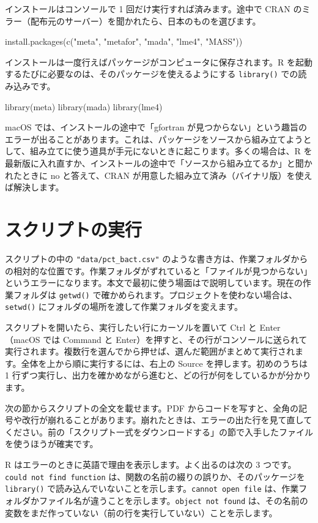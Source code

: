 インストールはコンソールで 1 回だけ実行すれば済みます。途中で CRAN のミラー（配布元のサーバー）を聞かれたら、日本のものを選びます。
\begin{rcode}
install.packages(c("meta", "metafor", "mada", "lme4", "MASS"))
\end{rcode}

インストールは一度行えばパッケージがコンピュータに保存されます。R を起動するたびに必要なのは、そのパッケージを使えるようにする \texttt{library()} での読み込みです。
\begin{rcode}
library(meta)
library(mada)
library(lme4)
\end{rcode}

macOS では、インストールの途中で「gfortran が見つからない」という趣旨のエラーが出ることがあります。これは、パッケージをソースから組み立てようとして、組み立てに使う道具が手元にないときに起こります。多くの場合は、R を最新版に入れ直すか、インストールの途中で「ソースから組み立てるか」と聞かれたときに no と答えて、CRAN が用意した組み立て済み（バイナリ版）を使えば解決します。

\section{スクリプトの実行}
\label{sec:A-5}

スクリプトの中の \texttt{"data/pct\_bact.csv"} のような書き方は、作業フォルダからの相対的な位置です。作業フォルダがずれていると「ファイルが見つからない」というエラーになります。本文で最初に使う場面はで説明しています。現在の作業フォルダは \texttt{getwd()} で確かめられます。プロジェクトを使わない場合は、\texttt{setwd()} にフォルダの場所を渡して作業フォルダを変えます。

スクリプトを開いたら、実行したい行にカーソルを置いて Ctrl と Enter（macOS では Command と Enter）を押すと、その行がコンソールに送られて実行されます。複数行を選んでから押せば、選んだ範囲がまとめて実行されます。全体を上から順に実行するには、右上の Source を押します。初めのうちは 1 行ずつ実行し、出力を確かめながら進むと、どの行が何をしているかが分かります。

次の節からスクリプトの全文を載せます。PDF からコードを写すと、全角の記号や改行が崩れることがあります。崩れたときは、エラーの出た行を見て直してください。前の「スクリプト一式をダウンロードする」の節で入手したファイルを使うほうが確実です。

\begin{KKfbox9ao}[R のメモ]
R はエラーのときに英語で理由を表示します。よく出るのは次の 3 つです。\texttt{could not find function} は、関数の名前の綴りの誤りか、そのパッケージを \texttt{library()} で読み込んでいないことを示します。\texttt{cannot open file} は、作業フォルダかファイル名が違うことを示します。\texttt{object not found} は、その名前の変数をまだ作っていない（前の行を実行していない）ことを示します。
\end{KKfbox9ao}

